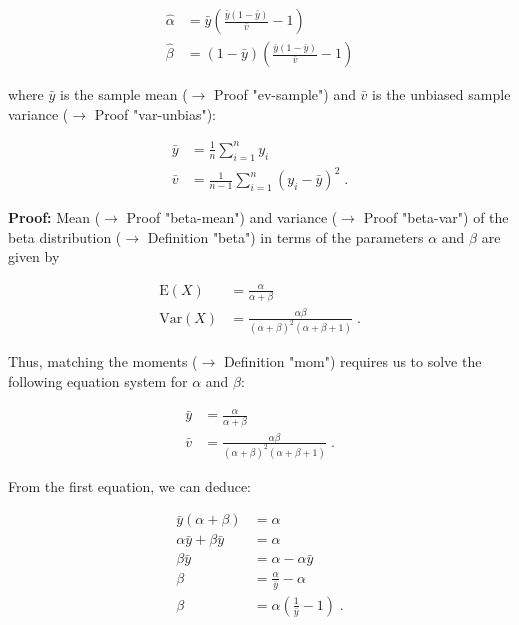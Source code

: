 \documentclass[a4paper,12pt]{book}
\begin{document}
\begin{equation} \label{eq:beta-mom-Beta-MoM}
\begin{split}
\hat{\alpha} &= \bar{y} \left( \frac{\bar{y} (1-\bar{y})}{\bar{v}} - 1  \right) \\
\hat{\beta} &= (1-\bar{y}) \left( \frac{\bar{y} (1-\bar{y})}{\bar{v}} - 1  \right)
\end{split}
\end{equation}

where $\bar{y}$ is the sample mean ($\rightarrow$ Proof "ev-sample") and $\bar{v}$ is the unbiased sample variance ($\rightarrow$ Proof "var-unbias"):

\begin{equation} \label{eq:beta-mom-y-mean-var}
\begin{split}
\bar{y} &= \frac{1}{n} \sum_{i=1}^n y_i \\
\bar{v} &= \frac{1}{n-1} \sum_{i=1}^n (y_i - \bar{y})^2 \; .
\end{split}
\end{equation}


\vspace{1em}
\textbf{Proof:} Mean ($\rightarrow$ Proof "beta-mean") and variance ($\rightarrow$ Proof "beta-var") of the beta distribution ($\rightarrow$ Definition "beta") in terms of the parameters $\alpha$ and $\beta$ are given by

\begin{equation} \label{eq:beta-mom-Beta-E-Var}
\begin{split}
\mathrm{E}(X) &= \frac{\alpha}{\alpha+\beta} \\
\mathrm{Var}(X) &= \frac{\alpha\beta}{(\alpha+\beta)^2 (\alpha+\beta+1)} \; .
\end{split}
\end{equation}

Thus, matching the moments ($\rightarrow$ Definition "mom") requires us to solve the following equation system for $\alpha$ and $\beta$:

\begin{equation} \label{eq:beta-mom-Beta-mean-var}
\begin{split}
\bar{y} &= \frac{\alpha}{\alpha+\beta} \\
\bar{v} &= \frac{\alpha\beta}{(\alpha+\beta)^2 (\alpha+\beta+1)} \; .
\end{split}
\end{equation}

From the first equation, we can deduce:

\begin{equation} \label{eq:beta-mom-beta-as-alpha}
\begin{split}
\bar{y}(\alpha+\beta) &= \alpha \\
\alpha \bar{y} + \beta \bar{y} &= \alpha \\
\beta \bar{y} &= \alpha - \alpha \bar{y} \\
\beta &= \frac{\alpha}{\bar{y}} - \alpha \\
\beta &= \alpha \left( \frac{1}{\bar{y}} - 1 \right) \; .
\end{split}
\end{equation}
\end{document}
